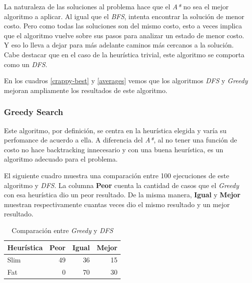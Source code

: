 \documentclass[a4paper,10pt]{article}
\begin{document}
    La naturaleza de las soluciones al problema hace que el \textit{A*} no sea el mejor algoritmo a aplicar. Al igual que el \textit{BFS}, intenta encontrar la solución de menor costo.
    Pero como todas las soluciones son del mismo costo, esto a veces implica que el algoritmo vuelve sobre sus pasos para analizar un estado de menor costo.
    Y eso lo lleva a dejar para más adelante caminos más cercanos a la solución. \\
    Cabe destacar que en el caso de la heurística trivial, este algoritmo se comporta como un \textit{DFS}.

    En los cuadros \ref{crappy-best} y \ref{averages} vemos que los algoritmos \textit{DFS} y \textit{Greedy} mejoran ampliamente los resultados de este algoritmo.

    \subsubsection{Greedy Search}
    
    Este algoritmo, por definición, se centra en la heurística elegida y varía su perfomance de acuerdo a ella.
    A diferencia del \textit{A*}, al no tener una función de costo no hace backtracking innecesario y con una buena heurística, es un algoritmo adecuado para el problema.

    El siguiente cuadro muestra una comparación entre 100 ejecuciones de este algoritmo y \textit{DFS}.
    La columna \textbf{Peor} cuenta la cantidad de casos que el \textit{Greedy} con esa heurística dio un peor resultado.
    De la misma manera, \textbf{Igual} y \textbf{Mejor} muestran respectivamente cuantas veces dio el mismo resultado y un mejor resultado.

    \begin{table}[H]
        \label{greedy-dfs}

        \begin{center}
        \begin{tabular}{l|r|r|r}
            Heurística & Peor & Igual & Mejor \\
            \hline
            Slim & 49 & 36 & 15 \\
            Fat & 0 & 70 & 30 \\
        \end{tabular}
        \end{center}
        \caption{Comparación entre \textit{Greedy} y \textit{DFS}}

    \end{table}
\end{document}
